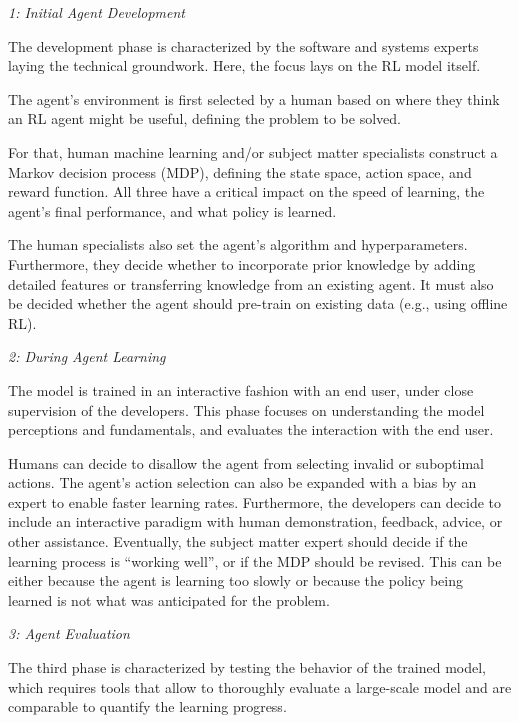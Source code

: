 \documentclass[twoside,11pt]{article}
\begin{document}
\vspace{2mm}
\emph{1: Initial Agent Development}

The development phase is characterized by the software and systems experts laying the technical groundwork. Here, the focus lays on the RL model itself.

The agent's environment is first selected by a human based on where they think an RL agent might be useful, defining the problem to be solved. 

For that, human machine learning and/or subject matter specialists construct a Markov decision process (MDP), defining the state space, action space, and reward function. All three have a critical impact on the speed of learning, the agent's final performance, and what policy is learned. 

The human specialists also set the agent's algorithm and hyperparameters. Furthermore, they  decide whether to incorporate prior knowledge by adding detailed features or transferring knowledge from an existing agent. It must also be decided whether the agent should pre-train on existing data (e.g., using offline RL).
\vspace{2mm}

\emph{2: During Agent Learning}

The model is trained in an interactive fashion with an end user, under close supervision of the developers. This phase focuses on understanding the model perceptions and fundamentals, and evaluates the interaction with the end user.

Humans can decide to disallow the agent from selecting invalid or suboptimal actions. The agent's action selection can also be expanded with a bias by an expert to  enable faster learning rates. Furthermore, the developers can decide to include an interactive paradigm with human demonstration, feedback, advice, or other assistance.
Eventually, the subject matter expert should decide if the learning process is ``working well'', or if the MDP should be revised. This can be either because the agent is learning too slowly or because the policy being learned is not what was anticipated for the problem.
\vspace{2mm}

\emph{3: Agent Evaluation}

The third phase is characterized by testing the behavior of the trained model, which requires tools that allow to thoroughly evaluate a large-scale model and are comparable to quantify the learning progress.
\end{document}
